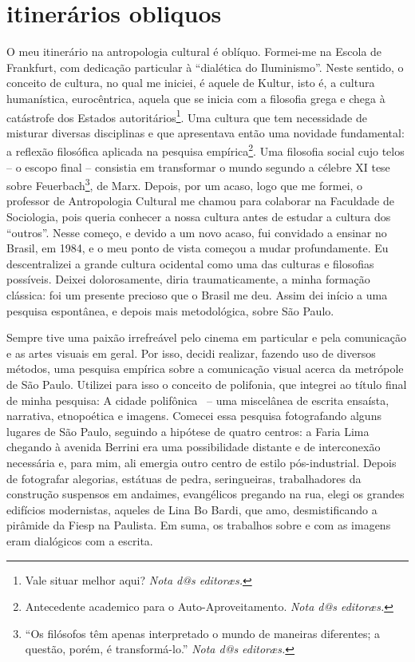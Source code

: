 \documentclass[a4paper, 11pt]{article} %
\makeatletter
\newcommand{\ftnt}[1]{\footnote{#1 \emph{Nota d@s editoræs.}}}
\makeatother
\begin{document}
\section*{itinerários obliquos}\label{sec:itine}
 O meu itinerário na antropologia cultural é oblíquo. Formei-me na Escola de Frankfurt, com dedicação particular à “dialética do Iluminismo”. Neste sentido, o conceito de cultura, no qual me iniciei, é aquele de Kultur, isto é, a cultura humanística, eurocêntrica, aquela que se inicia com a filosofia grega e chega à catástrofe dos Estados autoritários\ftnt{Vale situar melhor aqui?}. Uma cultura que tem necessidade de misturar diversas disciplinas e que apresentava então uma novidade fundamental: a reflexão filosófica aplicada na pesquisa empírica\ftnt{Antecedente academico para o Auto-Aproveitamento.}. Uma filosofia social cujo telos – o escopo final – consistia em transformar o mundo segundo a célebre XI tese sobre Feuerbach\ftnt{``Os filósofos têm apenas interpretado o mundo de maneiras diferentes; a questão, porém, é transformá-lo.''}, de Marx. Depois, por um acaso, logo que me formei, o professor de Antropologia Cultural me chamou para colaborar na Faculdade de Sociologia, pois queria conhecer a nossa cultura antes de estudar a cultura dos “outros”. Nesse começo, e devido a um novo acaso, fui convidado a ensinar no Brasil, em 1984, e o meu ponto de vista começou a mudar profundamente. Eu descentralizei a grande cultura ocidental como uma das culturas e filosofias possíveis. Deixei dolorosamente, diria traumaticamente, a minha formação clássica: foi um presente precioso que o Brasil me deu. Assim dei início a uma pesquisa espontânea, e depois mais metodológica, sobre São Paulo. 

Sempre tive uma paixão irrefreável pelo cinema em particular e pela comunicação e as artes visuais em geral. Por isso, decidi realizar, fazendo uso de diversos métodos, uma pesquisa empírica sobre a comunicação visual acerca da metrópole de São Paulo. Utilizei para isso o conceito de polifonia, que integrei ao título final de minha pesquisa: A cidade polifônica~\cite{b1} – uma miscelânea de escrita ensaísta, narrativa, etnopoética e imagens. Comecei essa pesquisa fotografando alguns lugares de São Paulo, seguindo a hipótese de quatro centros: a Faria Lima chegando à avenida Berrini era uma possibilidade distante e de interconexão necessária e, para mim, ali emergia outro centro de estilo pós-industrial. Depois de fotografar alegorias, estátuas de pedra, seringueiras, trabalhadores da construção suspensos em andaimes, evangélicos pregando na rua, elegi os grandes edifícios modernistas, aqueles de Lina Bo Bardi, que amo, desmistificando a pirâmide da Fiesp na Paulista. Em suma, os trabalhos sobre e com as imagens eram dialógicos com a escrita. 
\end{document}
